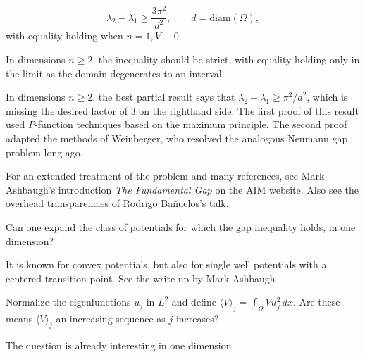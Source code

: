 \documentclass[12pt,letterpaper, reqno]{aimpl}
\begin{document}
\begin{problemblock}

\begin{conjecture}[3.1]
\[
\lambda_2 - \lambda_1 \geq \frac{3\pi^2}{d^2} , \qquad d=\text{diam}(\Omega) ,
\]
with equality holding when $n=1, V \equiv 0$.
\end{conjecture}

In dimensions $n \geq
2$, the inequality should be strict, with equality holding only in
the limit as the domain degenerates to an interval.


\begin{remark}
In dimensions $n \geq 2$, the best partial result says that
$\lambda_2 - \lambda_1 \geq \pi^2/d^2$, which is missing the desired
factor of $3$ on the righthand side. The first proof of this result
used $P$-function techniques based on the maximum principle. The
second proof adapted the methods of Weinberger, who resolved the
analogous Neumann gap problem long ago.
\end{remark}

\begin{remark}
For an extended treatment of the problem and many references, see
Mark Ashbaugh's introduction \emph{The Fundamental Gap} on the AIM
website. Also see the overhead transparencies of Rodrigo Ba\~{n}uelos's
talk.
\end{remark}
\end{problemblock}


\begin{problemblock}

\begin{problem}[3.15]
Can one expand the class of
potentials for which the gap inequality holds, in one dimension? 
\end{problem}

It
is known for convex potentials, but also for single well potentials
with a centered transition point. See the write-up by Mark Ashbaugh

\end{problemblock}

\begin{problemblock}
\begin{problem}[3.2]
Normalize the eigenfunctions
$u_j$ in $L^2$ and define $\langle V \rangle_j = \int_\Omega V u_j^2
\, dx$. Are these means  $\langle V \rangle_j$ an increasing
sequence as $j$ increases?
\end{problem}

 The question is already interesting in
one dimension.

\end{problemblock}
\end{document}

